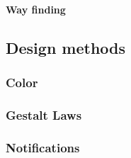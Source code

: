 \textbf{Way finding}

\subsection{Design methods}

\subsubsection*{Color}

\subsubsection*{Gestalt Laws}

\subsubsection*{Notifications}










